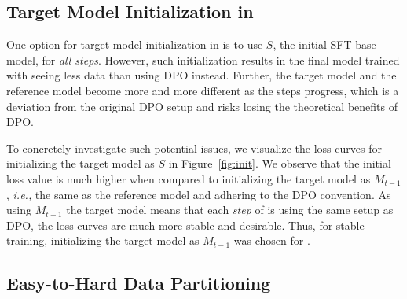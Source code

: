 \begin{table*}[t!]
\centering
{}
\caption{Comparison between the easy-to-hard and random partitioning strategies. `SOLAR 10.7B + SFT + \method' uses the easy-to-hard partitioning whereas `SOLAR 10.7B + SFT + \method Rand.' denotes \method with random partitioning instead. Easy-to-hard partitioning is better than random partitioning. The best scores are shown in bold.}
\label{tab:easy2hard}
\end{table*}
\subsection{Target Model Initialization in \method}
One option for target model initialization in \method is to use $S$, the initial SFT base model, for {\it all steps}.
However, such initialization results in the final model trained with \method seeing less data than using DPO instead.
Further, the target model and the reference model become more and more different as the steps progress, which is a deviation from the original DPO setup and risks losing the theoretical benefits of DPO.

To concretely investigate such potential issues, we visualize the loss curves for initializing the target model as $S$ in Figure~\ref{fig:init}.
We observe that the initial loss value is much higher when compared to initializing the target model as $M_{t-1}$, \textit{i.e.,} the same as the reference model and adhering to the DPO convention.
As using $M_{t-1}$ the target model means that each {\it step} of \method is using the same setup as DPO, the loss curves are much more stable and desirable.
Thus, for stable training, initializing the target model as $M_{t-1}$ was chosen for \method.

\subsection{Easy-to-Hard Data Partitioning}

